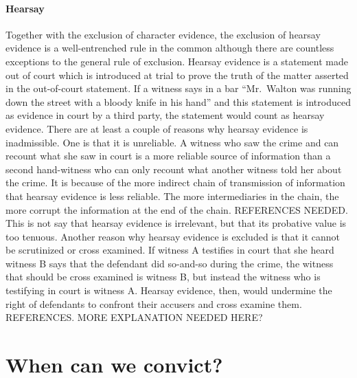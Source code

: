 \documentclass[10pt]{article}
\begin{document}
 \paragraph{Hearsay} Together with the exclusion of character evidence, the exclusion of hearsay evidence  is a well-entrenched rule in the common although there are countless exceptions to the general rule of exclusion. Hearsay evidence is a statement made out of court which is introduced at trial to prove the truth of the matter asserted in the out-of-court statement. If a witness says in a bar  ``Mr.\ Walton was running down the street with a bloody knife in his hand'' and this statement is introduced as evidence in court by a third party, the statement would count as hearsay evidence. 
There are at least a couple of reasons why hearsay evidence is inadmissible. One is that it is unreliable. A witness who saw the crime and can recount what she saw in court is a more reliable source of information than a second hand-witness who can only recount what another witness told her about the crime. It is because of the more indirect chain of transmission of information that hearsay evidence is less reliable. The more intermediaries in the chain, the more corrupt the information at the end of the chain. REFERENCES NEEDED.  This is not say that hearsay evidence is irrelevant, but that its probative value is too tenuous. Another reason why hearsay evidence is excluded is that it cannot be scrutinized or cross examined. If witness A testifies in court that she heard witness B says that the defendant did so-and-so during the crime, the witness that should be cross examined is witness B, but instead the witness who is testifying in court is witness A. Hearsay evidence, then, would undermine the right of defendants to confront their accusers and cross examine them. REFERENCES. MORE EXPLANATION NEEDED HERE?









\section{When can we convict?}
\label{sec:whenconv}
\end{document}
